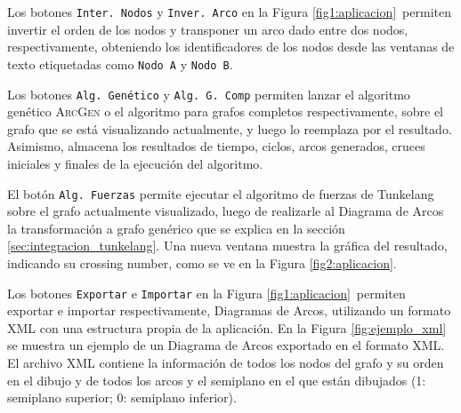 Los botones \texttt{Inter. Nodos} y \texttt{Inver. Arco} en la  Figura \ref{fig1:aplicacion}\ permiten invertir el orden de los nodos y transponer un arco dado entre dos nodos, respectivamente, obteniendo los identificadores de los nodos desde las ventanas de texto etiquetadas como \texttt{Nodo A} y \texttt{Nodo B}. 

Los botones \texttt{Alg. Genético} y \texttt{Alg. G. Comp} permiten lanzar el algoritmo genético \textsc{ArcGen} o el algoritmo para grafos completos respectivamente, sobre el grafo que se está visualizando actualmente, y luego lo reemplaza por el resultado. Asimismo,  almacena los resultados de tiempo, ciclos, arcos generados, cruces iniciales y finales de la ejecución del algoritmo.

El botón \texttt{Alg. Fuerzas} permite ejecutar el algoritmo de fuerzas de Tunkelang sobre el grafo actualmente visualizado, luego  de realizarle al Diagrama de Arcos la transformación a grafo genérico que se explica en la sección \ref{sec:integracion_tunkelang}. Una nueva ventana  muestra la gráfica del resultado, indicando su crossing number, como se ve en la Figura   \ref{fig2:aplicacion}.

Los botones \texttt{Exportar} e \texttt{Importar} en la Figura \ref{fig1:aplicacion}\ permiten exportar e importar respectivamente, Diagramas de Arcos, utilizando un formato XML con una estructura propia de la aplicación. En la Figura \ref{fig:ejemplo_xml} se muestra un ejemplo de un Diagrama de Arcos exportado en el formato XML. El archivo XML contiene la información de todos los  nodos del grafo y su orden en el dibujo y de  todos los arcos y el semiplano en el que están dibujados  (1: semiplano  superior; 0: semiplano inferior).


